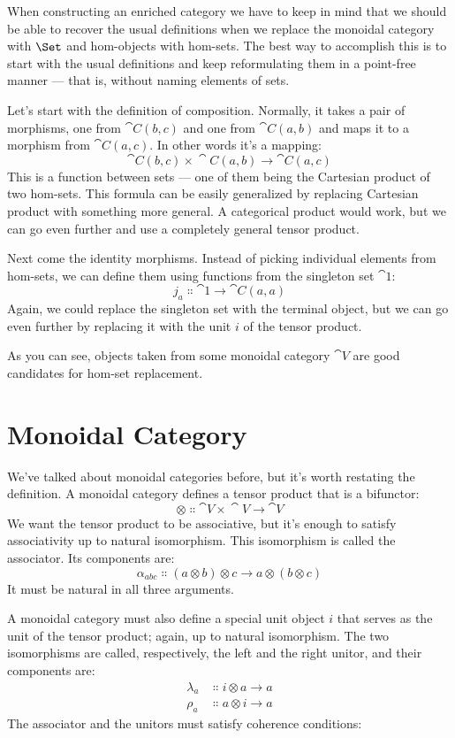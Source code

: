 When constructing an enriched category we have to keep in mind that we
should be able to recover the usual definitions when we replace the
monoidal category with $\Set$ and hom-objects with hom-sets. The
best way to accomplish this is to start with the usual definitions and
keep reformulating them in a point-free manner --- that is, without
naming elements of sets.

Let's start with the definition of composition. Normally, it takes a
pair of morphisms, one from $\cat{C}(b, c)$ and one from
$\cat{C}(a, b)$ and maps it to a morphism from $\cat{C}(a, c)$. In
other words it's a mapping:
\[\cat{C}(b, c)\times{}\cat{C}(a, b) \to \cat{C}(a, c)\]
This is a function between sets --- one of them being the Cartesian
product of two hom-sets. This formula can be easily generalized by
replacing Cartesian product with something more general. A categorical
product would work, but we can go even further and use a completely
general tensor product.

Next come the identity morphisms. Instead of picking individual elements
from hom-sets, we can define them using functions from the singleton set
$\cat{1}$:
\[j_a \Colon \cat{1} \to \cat{C}(a, a)\]
Again, we could replace the singleton set with the terminal object, but
we can go even further by replacing it with the unit $i$ of the
tensor product.

As you can see, objects taken from some monoidal category $\cat{V}$ are
good candidates for hom-set replacement.

\section{Monoidal Category}

We've talked about monoidal categories before, but it's worth restating
the definition. A monoidal category defines a tensor product that is a
bifunctor:
\[\otimes \Colon \cat{V}\times{}\cat{V} \to \cat{V}\]
We want the tensor product to be associative, but it's enough to satisfy
associativity up to natural isomorphism. This isomorphism is called the
associator. Its components are:
\[\alpha_{a b c} \Colon (a \otimes b) \otimes c \to a \otimes (b \otimes c)\]
It must be natural in all three arguments.

A monoidal category must also define a special unit object $i$
that serves as the unit of the tensor product; again, up to natural
isomorphism. The two isomorphisms are called, respectively, the left and
the right unitor, and their components are:
\begin{align*}
\lambda_a &\Colon i \otimes a \to a \\
\rho_a &\Colon a \otimes i \to a
\end{align*}
The associator and the unitors must satisfy coherence conditions:

